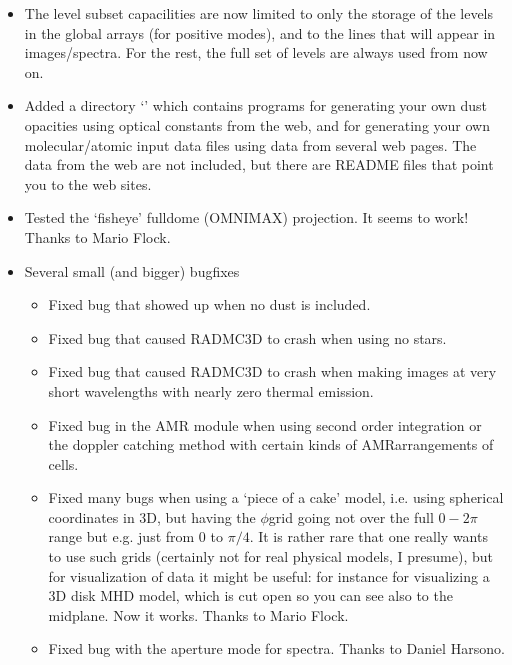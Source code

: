 \documentclass[letterpaper,10pt,english]{sphinxmanual}
\begin{document}
\begin{itemize}
\begin{itemize}
\item {} 
The level subset capacilities are now limited to only the storage of
the levels in the global arrays (for positive  modes),
and to the lines that will appear in
images/spectra. For the rest, the full set of levels are always used
from now on.

\item {} 
Added a directory ‘’ which contains programs
for generating your own dust opacities using optical constants from the
web, and for generating your own molecular/atomic input data files using
data from several web pages. The data from the web are not included, but
there are README files that point you to the web sites.

\item {} 
Tested the ‘fisheye’ fulldome (OMNIMAX) projection. It seems to
work! Thanks to Mario Flock.

\item {} 
Several small (and bigger) bugfixes
\begin{itemize}
\item {} 
Fixed bug that showed up when no dust is included.

\item {} 
Fixed bug that caused RADMC\sphinxhyphen{}3D to crash when using no stars.

\item {} 
Fixed bug that caused RADMC\sphinxhyphen{}3D to crash when making images at very
short wavelengths with nearly zero thermal emission.

\item {} 
Fixed bug in the AMR module when using second order integration or
the doppler catching method with certain kinds of AMR\sphinxhyphen{}arrangements of
cells.

\item {} 
Fixed many bugs when using a ‘piece of a cake’ model, i.e.
using spherical coordinates in 3\sphinxhyphen{}D, but having the \(\phi\)\sphinxhyphen{}grid going
not over the full \(0-2\pi\) range but e.g. just from 0 to \(\pi/4\). It
is rather rare that one really wants to use such grids (certainly not
for real physical models, I presume), but for visualization of data it
might be useful: for instance for visualizing a 3\sphinxhyphen{}D disk MHD model,
which is cut open so you can see also to the midplane. Now it
works. Thanks to Mario Flock.

\item {} 
Fixed bug with the aperture mode for spectra. Thanks to Daniel Harsono.


\end{itemize}
\end{itemize}
\end{itemize}
\end{document}
